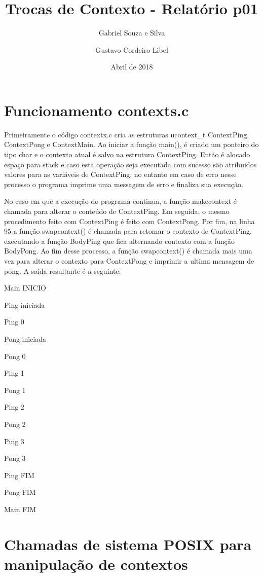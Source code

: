 \documentclass[12pt]{article}
\title{Trocas de Contexto - Relatório p01} %
\author{Gabriel Souza e Silva \and Gustavo Cordeiro Libel} %
\date{Abril de 2018} %
\begin{document}
\maketitle %


\section{Funcionamento contexts.c}
Primeiramente o código contextx.c cria as estruturas ucontext\_t ContextPing, ContextPong e ContextMain. Ao iniciar a função main(), é criado um ponteiro do tipo char e o contexto atual é salvo na estrutura ContextPing. Então é alocado espaço para stack e caso esta operação seja executada com sucesso são atribuidos valores para as variáveis de ContextPing, no entanto em caso de erro nesse processo o programa imprime uma messagem de erro e finaliza sua execução.

No caso em que a execução do programa continua, a função makecontext é chamada para alterar o conteúdo de ContextPing. Em seguida, o mesmo procedimento feito com ContextPing é feito com ContextPong. Por fim, na linha 95 a função swapcontext() é chamada para retomar o contexto de ContextPing, executando a função BodyPing que fica alternando contexto com a função BodyPong. Ao fim desse processo, a função swapcontext() é chamada mais uma vez para alterar o contexto para ContextPong e imprimir a ultima mensagem de pong. A saída resultante é a seguinte:

Main INICIO

Ping iniciada

Ping 0

Pong iniciada

Pong 0

Ping 1

Pong 1

Ping 2

Pong 2

Ping 3

Pong 3

Ping FIM

Pong FIM

Main FIM

\section{Chamadas de sistema POSIX para manipulação de contextos}
\end{document}
